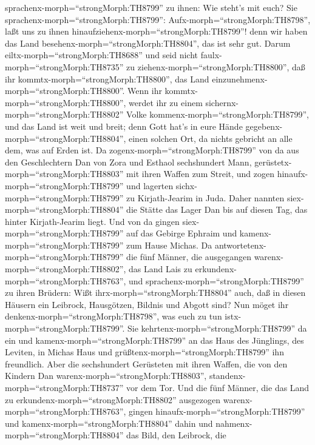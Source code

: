 sprachenx-morph=``strongMorph:TH8799'' zu ihnen: Wie steht's mit euch?
 Sie sprachenx-morph=``strongMorph:TH8799'':
Aufx-morph=``strongMorph:TH8798'', laßt uns zu ihnen
hinaufziehenx-morph=``strongMorph:TH8799''! denn wir haben das Land
besehenx-morph=``strongMorph:TH8804'', das ist sehr gut. Darum
eiltx-morph=``strongMorph:TH8688'' und seid nicht
faulx-morph=``strongMorph:TH8735'' zu
ziehenx-morph=``strongMorph:TH8800'', daß ihr
kommtx-morph=``strongMorph:TH8800'', das Land
einzunehmenx-morph=``strongMorph:TH8800''.  Wenn ihr
kommtx-morph=``strongMorph:TH8800'', werdet ihr zu einem
sichernx-morph=``strongMorph:TH8802'' Volke
kommenx-morph=``strongMorph:TH8799'', und das Land ist weit und breit;
denn Gott hat's in eure Hände gegebenx-morph=``strongMorph:TH8804'',
einen solchen Ort, da nichts gebricht an alle dem, was auf Erden ist.
 Da zogenx-morph=``strongMorph:TH8799'' von da aus den
Geschlechtern Dan von Zora und Esthaol sechshundert Mann,
gerüstetx-morph=``strongMorph:TH8803'' mit ihren Waffen zum Streit,
 und zogen hinaufx-morph=``strongMorph:TH8799'' und
lagerten sichx-morph=``strongMorph:TH8799'' zu Kirjath-Jearim in Juda.
Daher nannten siex-morph=``strongMorph:TH8804'' die Stätte das Lager Dan
bis auf diesen Tag, das hinter Kirjath-Jearim liegt.  Und
von da gingen siex-morph=``strongMorph:TH8799'' auf das Gebirge Ephraim
und kamenx-morph=``strongMorph:TH8799'' zum Hause Michas. 
Da antwortetenx-morph=``strongMorph:TH8799'' die fünf Männer, die
ausgegangen warenx-morph=``strongMorph:TH8802'', das Land Lais zu
erkundenx-morph=``strongMorph:TH8763'', und
sprachenx-morph=``strongMorph:TH8799'' zu ihren Brüdern: Wißt
ihrx-morph=``strongMorph:TH8804'' auch, daß in diesen Häusern ein
Leibrock, Hausgötzen, Bildnis und Abgott sind? Nun möget ihr
denkenx-morph=``strongMorph:TH8798'', was euch zu tun
istx-morph=``strongMorph:TH8799''.  Sie
kehrtenx-morph=``strongMorph:TH8799'' da ein und
kamenx-morph=``strongMorph:TH8799'' an das Haus des Jünglings, des
Leviten, in Michas Haus und grüßtenx-morph=``strongMorph:TH8799'' ihn
freundlich.  Aber die sechshundert Gerüsteten mit ihren
Waffen, die von den Kindern Dan warenx-morph=``strongMorph:TH8803'',
standenx-morph=``strongMorph:TH8737'' vor dem Tor.  Und die
fünf Männer, die das Land zu erkundenx-morph=``strongMorph:TH8802''
ausgezogen warenx-morph=``strongMorph:TH8763'', gingen
hinaufx-morph=``strongMorph:TH8799'' und
kamenx-morph=``strongMorph:TH8804'' dahin und
nahmenx-morph=``strongMorph:TH8804'' das Bild, den Leibrock, die

